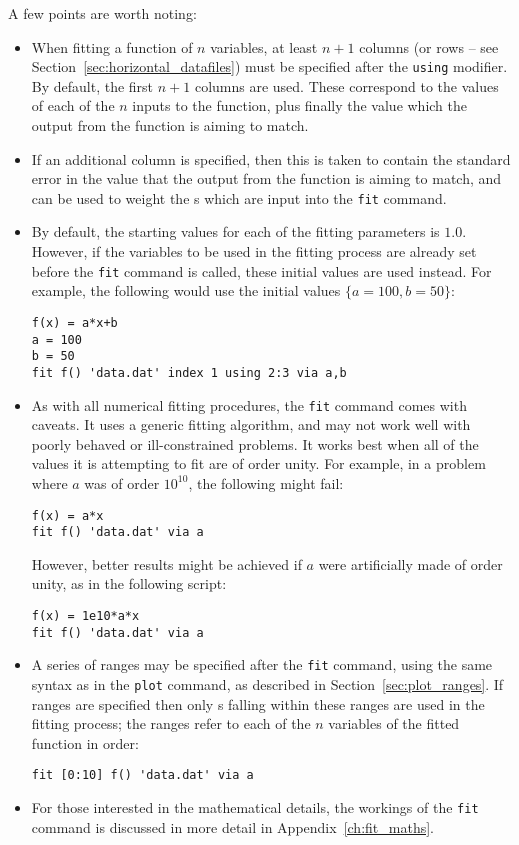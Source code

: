 A few points are worth noting:

\begin{itemize}
\item When fitting a function of $n$ variables, at least $n+1$ columns (or
rows -- see Section~\ref{sec:horizontal_datafiles}) must be specified after the
{\tt using} modifier. By default, the first $n+1$ columns are used. These
correspond to the values of each of the $n$ inputs to the function, plus
finally the value which the output from the function is aiming to match.
\item If an additional column is specified, then this is taken to contain the
standard error in the value that the output from the function is aiming to
match, and can be used to weight the \datapoint s which are input into the
{\tt fit} command.
\item By default, the starting values for each of the fitting parameters is
$1.0$. However, if the variables to be used in the fitting process are already
set before the {\tt fit} command is called, these initial values are used
instead. For example, the following would use the initial values
$\{a=100,b=50\}$:
\begin{verbatim}
f(x) = a*x+b
a = 100
b = 50
fit f() 'data.dat' index 1 using 2:3 via a,b
\end{verbatim}

\item As with all numerical fitting procedures, the {\tt fit} command comes
with caveats. It uses a generic fitting algorithm, and may not work well with
poorly behaved or ill-constrained problems. It works best when all of the
values it is attempting to fit are of order unity. For example, in a problem
where $a$ was of order $10^{10}$, the following might fail:
\begin{verbatim}
f(x) = a*x
fit f() 'data.dat' via a
\end{verbatim}
However, better results might be achieved if $a$ were artificially made of
order unity, as in the following script:
\begin{verbatim}
f(x) = 1e10*a*x
fit f() 'data.dat' via a
\end{verbatim}

\item A series of ranges may be specified after the {\tt fit} command, using
the same syntax as in the {\tt plot} command, as described in
Section~\ref{sec:plot_ranges}. If ranges are specified then only \datapoint s
falling within these ranges are used in the fitting process; the ranges refer
to each of the $n$ variables of the fitted function in order:
\begin{verbatim}
fit [0:10] f() 'data.dat' via a
\end{verbatim}

\item For those interested in the mathematical details, the workings of the
{\tt fit} command is discussed in more detail in Appendix~\ref{ch:fit_maths}.

\end{itemize}

